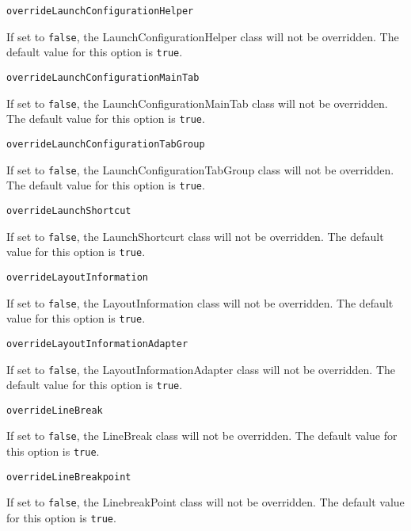\noindent\texttt{overrideLaunchConfigurationHelper}
\begin{myindentpar}{1cm}
If set to \texttt{false}, the LaunchConfigurationHelper class will not be overridden. The default value for this option is \texttt{true}.
\end{myindentpar}

\noindent\texttt{overrideLaunchConfigurationMainTab}
\begin{myindentpar}{1cm}
If set to \texttt{false}, the LaunchConfigurationMainTab class will not be overridden. The default value for this option is \texttt{true}.
\end{myindentpar}

\noindent\texttt{overrideLaunchConfigurationTabGroup}
\begin{myindentpar}{1cm}
If set to \texttt{false}, the LaunchConfigurationTabGroup class will not be overridden. The default value for this option is \texttt{true}.
\end{myindentpar}

\noindent\texttt{overrideLaunchShortcut}
\begin{myindentpar}{1cm}
If set to \texttt{false}, the LaunchShortcurt class will not be overridden. The default value for this option is \texttt{true}.
\end{myindentpar}

\noindent\texttt{overrideLayoutInformation}
\begin{myindentpar}{1cm}
If set to \texttt{false}, the LayoutInformation class will not be overridden. The default value for this option is \texttt{true}.
\end{myindentpar}

\noindent\texttt{overrideLayoutInformationAdapter}
\begin{myindentpar}{1cm}
If set to \texttt{false}, the LayoutInformationAdapter class will not be overridden. The default value for this option is \texttt{true}.
\end{myindentpar}

\noindent\texttt{overrideLineBreak}
\begin{myindentpar}{1cm}
If set to \texttt{false}, the LineBreak class will not be overridden. The default value for this option is \texttt{true}.
\end{myindentpar}

\noindent\texttt{overrideLineBreakpoint}
\begin{myindentpar}{1cm}
If set to \texttt{false}, the LinebreakPoint class will not be overridden. The default value for this option is \texttt{true}.
\end{myindentpar}

